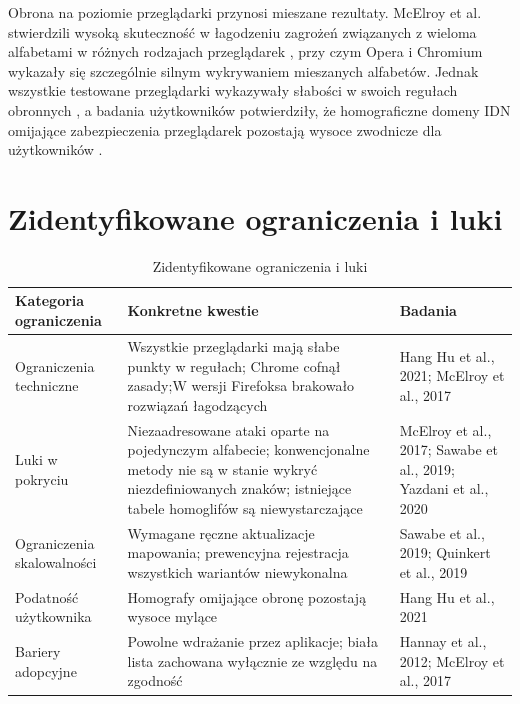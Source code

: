 Obrona na poziomie przeglądarki przynosi mieszane rezultaty. McElroy et al. stwierdzili wysoką skuteczność w łagodzeniu zagrożeń związanych z wieloma alfabetami w różnych rodzajach przeglądarek \cite{McElroy2017}, przy czym Opera i Chromium wykazały się szczególnie silnym wykrywaniem mieszanych alfabetów\cite{McElroy2017}. Jednak wszystkie testowane przeglądarki wykazywały słabości w swoich regułach obronnych \cite{Hu2021}, a badania użytkowników potwierdziły, że homograficzne domeny IDN omijające zabezpieczenia przeglądarek pozostają wysoce zwodnicze dla użytkowników \cite{Hu2021}.

\section{Zidentyfikowane ograniczenia i luki}

\begin{table}[!ht]
\centering
\caption{Zidentyfikowane ograniczenia i luki}
\label{tab:ograniczeniaTab}
{\footnotesize
\begin{tabularx}{\textwidth}{Lp{5cm}L}
\toprule
\textbf{Kategoria ograniczenia} & \textbf{Konkretne kwestie} & \textbf{
Badania} \\ \midrule
Ograniczenia techniczne  &  Wszystkie przeglądarki mają słabe punkty w regułach\cite{Hu2021}; Chrome cofnął zasady\cite{Hu2021};W wersji Firefoksa brakowało rozwiązań łagodzących\cite{McElroy2017}  & Hang Hu et al., 2021; McElroy et al., 2017 \\
Luki w pokryciu  & Niezaadresowane ataki oparte na pojedynczym alfabecie\cite{McElroy2017}; konwencjonalne metody nie są w stanie wykryć niezdefiniowanych znaków\cite{Sawabe2019}; istniejące tabele homoglifów są niewystarczające\cite{Yazdani2020} & McElroy et al., 2017; Sawabe et al., 2019; Yazdani et al., 2020  \\ 
Ograniczenia skalowalności  & Wymagane ręczne aktualizacje mapowania\cite{Sawabe2019}; prewencyjna rejestracja wszystkich wariantów niewykonalna\cite{Quinkert} & Sawabe et al., 2019; Quinkert et al., 2019  \\ 
Podatność użytkownika  & Homografy omijające obronę pozostają wysoce mylące & Hang Hu et al., 2021  \\ 
Bariery adopcyjne & Powolne wdrażanie przez aplikacje\cite{Hannay2011}; biała lista zachowana wyłącznie ze względu na zgodność\cite{McElroy2017}  & Hannay et al., 2012; McElroy et al., 2017  \\ \bottomrule
\end{tabularx}
}
\end{table}


